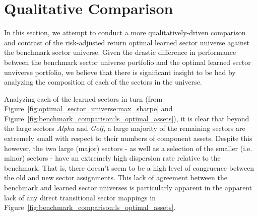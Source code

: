 \documentclass[../main.tex]{subfiles}
\begin{document}




\section{Qualitative Comparison}

In this section, we attempt to conduct a more qualitatively-driven comparison and contrast of the risk-adjusted return optimal learned sector universe against the benchmark sector universe. Given the drastic difference in performance between the benchmark sector universe portfolio and the optimal learned sector unviverse portfolio, we believe that there is significant insight to be had by analyzing the composition of each of the sectors in the universe.

Analyzing each of the learned sectors in turn (from Figure~\ref{fig:optimal_sector_universe:max_sharpe} and Figure~\ref{fig:benchmark_comparison:ls_optimal_assets}), it is clear that beyond the large sectors \textit{Alpha} and \textit{Golf}, a large majority of the remaining sectors are extremely small with respect to their numbers of component assets. Despite this however, the two large (major) sectors - as well as a selection of the smaller (i.e. minor) sectors - have an extremely high dispersion rate relative to the benchmark. That is, there doesn't seem to be a high level of congruence between the old and new sector assignments. This lack of agreement between the benchmark and learned sector universes is particularly apparent in the apparent lack of any direct transitional sector mappings in Figure~\ref{fig:benchmark_comparison:ls_optimal_assets}.
\end{document}
